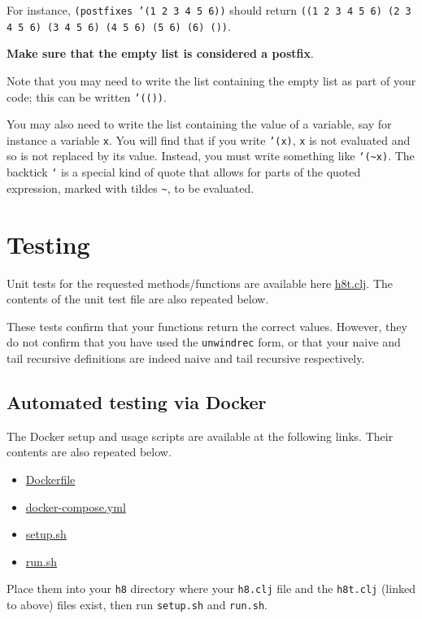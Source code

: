 \documentclass[11pt]{article}
\begin{document}
For instance, \texttt{(postfixes '(1 2 3 4 5 6))} should
return \texttt{((1 2 3 4 5 6) (2 3 4 5 6) (3 4 5 6) (4 5 6) (5 6) (6) ())}.

\textbf{Make sure that the empty list is considered a postfix}.

Note that you may need to write the list containing the empty list
as part of your code; this can be written \texttt{'(())}.

You may also need to write the list containing the value of a variable,
say for instance a variable \texttt{x}. You will find that
if you write \texttt{'(x)}, \texttt{x} is not evaluated and so is not replaced by its value.
Instead, you must write something like \texttt{`(\textasciitilde{}x)}. The backtick \texttt{`} is a special
kind of quote that allows for parts of the quoted expression,
marked with tildes \texttt{\textasciitilde{}}, to be evaluated.

\section*{Testing}
\label{sec:org5e0fae8}
Unit tests for the requested methods/functions
are available here \href{./testing/h8/h8t.clj}{h8t.clj}.
The contents of the unit test file are also repeated below.

\begin{center}
These tests confirm that your functions return the correct values.
However, they do not confirm that you have used the \texttt{unwindrec} form,
or that your naive and tail recursive definitions are indeed
naive and tail recursive respectively.
\end{center}

\subsection*{Automated testing via Docker}
\label{sec:org7ec87b6}
The Docker setup and usage scripts are available at the following links.
Their contents are also repeated below.
\begin{itemize}
\item \href{./testing/h8/Dockerfile}{Dockerfile}
\item \href{./testing/h8/docker-compose.yml}{docker-compose.yml}
\item \href{./testing/h8/setup.sh}{setup.sh}
\item \href{./testing/h8/run.sh}{run.sh}
\end{itemize}
Place them into your \texttt{h8} directory where your \texttt{h8.clj} file
and the \texttt{h8t.clj} (linked to above) files exist,
then run \texttt{setup.sh} and \texttt{run.sh}.
\end{document}
